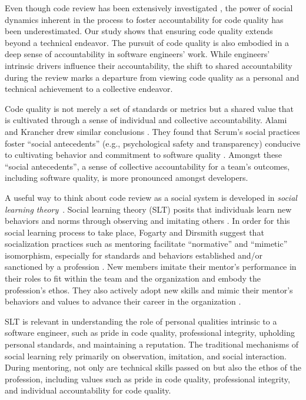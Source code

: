 \noindent Even though code review has been extensively investigated \citep{davila2021systematic,badampudi2023modern}, the power of social dynamics inherent in the process to foster accountability for code quality has been underestimated. Our study shows that ensuring code quality extends beyond a technical endeavor. The pursuit of code quality is also embodied in a deep sense of accountability in software engineers' work. While engineers' intrinsic drivers influence their accountability, the shift to shared accountability during the review marks a departure from viewing code quality as a personal and technical achievement to a collective endeavor.

Code quality is not merely a set of standards or metrics but a shared value that is cultivated through a sense of individual and collective accountability. Alami and Krancher drew similar conclusions \citep{alami2022scrum}. They found that Scrum's social practices foster ``social antecedents'' (e.g., psychological safety and transparency) conducive to cultivating behavior and commitment to software quality \citep{alami2022scrum}. Amongst these ``social antecedents'', a sense of collective accountability for a team's outcomes, including software quality, is more pronounced amongst developers.

A useful way to think about code review as a social system is developed in \emph{social learning theory}~\citep{bandura1977social}. Social learning theory (SLT) posits that individuals learn new behaviors and norms through observing and imitating others \citep{bandura1977social}. In order for this social learning process to take place, Fogarty and Dirsmith suggest that socialization practices such as mentoring facilitate ``normative'' and ``mimetic'' isomorphism, especially for standards and behaviors established and/or sanctioned by a profession \citep{fogarty2001organizational}. New members imitate their mentor's performance in their roles to fit within the team and the organization and embody the profession's ethos. They also actively adopt new skills and mimic their mentor's behaviors and values to advance their career in the organization \citep{fogarty2001organizational}.

SLT is relevant in understanding the role of personal qualities intrinsic to a software engineer, such as pride in code quality, professional integrity, upholding personal standards, and maintaining a reputation. The traditional mechanisms of social learning rely primarily on observation, imitation, and social interaction. During mentoring, not only are technical skills passed on but also the ethos of the profession, including values such as pride in code quality, professional integrity, and individual accountability for code quality.


